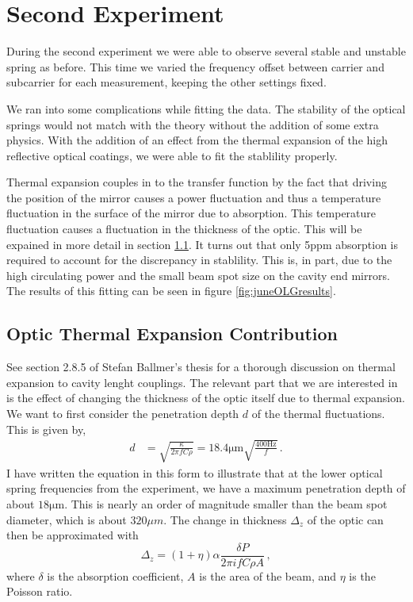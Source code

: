 \section{Second Experiment}

During the second experiment we were able to observe several stable and
unstable spring as before. This time we varied the frequency offset between
carrier and subcarrier for each measurement, keeping the other settings
fixed.

We ran into some complications while fitting the data.
The stability of the optical springs would not match with the theory without
the addition of some extra physics.
With the addition of an effect from the thermal expansion of the high
reflective optical coatings, we were able to fit the stablility
properly.

Thermal expansion couples in to the transfer function by the fact that driving
the position of the mirror causes a power fluctuation and thus a temperature
fluctuation in the surface of the mirror due to absorption.
This temperature fluctuation causes a fluctuation in the thickness
of the optic.
This will be expained in more detail in section
\ref{sec:opticthermalexpansion}.
It turns out that only 5ppm absorption is required to account for the
discrepancy in stablility.
This is, in part, due to the high circulating power and the small
beam spot size on the cavity end mirrors.
The results of this fitting can be seen in figure \ref{fig:juneOLGresults}.

\subsection{Optic Thermal Expansion Contribution}
\label{sec:opticthermalexpansion}
See section 2.8.5 of Stefan Ballmer's thesis  \cite{Ballmer:thesis} for
a thorough discussion on thermal expansion to cavity lenght couplings.
The relevant part that we are interested in is the effect of changing
the thickness of the optic itself due to thermal expansion.
We want to first consider the penetration depth $d$ of the thermal
fluctuations. This is given by,
\begin{align}
\label{eq:pendepth}
d &= \sqrt{\frac{\kappa}{2\pi fC\rho}} = 18.4 \mathrm{\mu m}
     \sqrt{\frac{400 \mathrm{Hz}}{f}} \,.
\end{align}
I have written the equation in this form to illustrate that at the lower
optical spring frequencies from the experiment, we have a maximum penetration
depth of about $18\mathrm{\mu m}$.
This is nearly an order of magnitude smaller than the beam spot diameter, which
is about $320\mu m$. The change in thickness $\Delta_z$ of the optic can then
be approximated with
\begin{equation} \label{eq:deltaz}
\Delta_z = \left(1+\eta\right)\alpha\frac{ \delta P }{2\pi ifC\rho A} \, ,
\end{equation}
where $\delta$ is the absorption coefficient, $A$ is the area of the beam,
and $\eta$ is the Poisson ratio.

